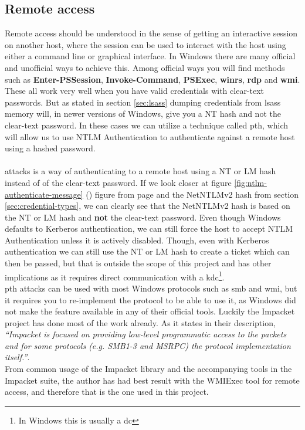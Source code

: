 \documentclass{article}
\begin{document}
\subsection{Remote access}
\label{sec:remote-access}
Remote access should be understood in the sense of getting an interactive session on another host, where the session can be used to interact with the host using either a command line or graphical interface. In Windows there are many official and unofficial ways to achieve this. Among official ways you will find methods such as \textbf{Enter-PSSession}, \textbf{Invoke-Command}, \textbf{PSExec}, \textbf{\gls{winrs}}, \textbf{\gls{rdp}} and \textbf{\gls{wmi}}\cite{url:stackoverflow:windows-remote-commands}. These all work very well when you have valid credentials with clear-text passwords. But as stated in section \ref{sec:lsass} dumping credentials from \gls{lsass} memory will, in newer versions of Windows, give you a NT hash and not the clear-text password. In these cases we can utilize a technique called \gls{pth}, which will allow us to use NTLM Authentication to authenticate against a remote host using a hashed password.
\paragraph{} attacks is a way of authenticating to a remote host using a NT or LM hash instead of of the clear-text password. If we look closer at figure \ref{fig:ntlm-authenticate-message} () figure from page \pageref{fig:ntlm-authenticate-message} and the NetNTLMv2 hash from section \ref{sec:credential-types}, we can clearly see that the NetNTLMv2 hash is based on the NT or LM hash and \textbf{not} the clear-text password. Even though Windows defaults to Kerberos authentication, we can still force the host to accept NTLM Authentication unless it is actively disabled. Though, even with Kerberos authentication we can still use the NT or LM hash to create a ticket which can then be passed, but that is outside the scope of this project and has other implications as it requires direct communication with a \gls{kdc}\footnote{In Windows this is usually a \gls{dc}}.
\\
\gls{pth} attacks can be used with most Windows protocols such as \gls{smb} and \gls{wmi}, but it requires you to re-implement the protocol to be able to use it, as Windows did not make the feature available in any of their official tools. Luckily the Impacket project has done most of the work already. As it states in their description, \emph{\enquote{Impacket is focused on providing low-level programmatic access to the packets and for some protocols (e.g. SMB1-3 and MSRPC) the protocol implementation itself.}}\cite{url:impacket:github}.
\\
From common usage of the Impacket library and the accompanying tools in the Impacket suite, the author has had best result with the WMIExec tool for remote access, and therefore that is the one used in this project.
\end{document}
